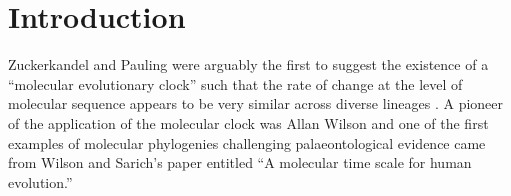 \section{Introduction} 
Zuckerkandel and Pauling were arguably the first to suggest the existence of a ``molecular evolutionary clock'' such that the rate of change at the level of molecular sequence appears to be very similar across diverse lineages \cite{zuckerkandl1965}. A pioneer of the application of the molecular clock was Allan Wilson and one of the first examples of molecular phylogenies challenging palaeontological evidence came from Wilson and Sarich's paper entitled ``A molecular time scale for human evolution.''
  
  
  
  